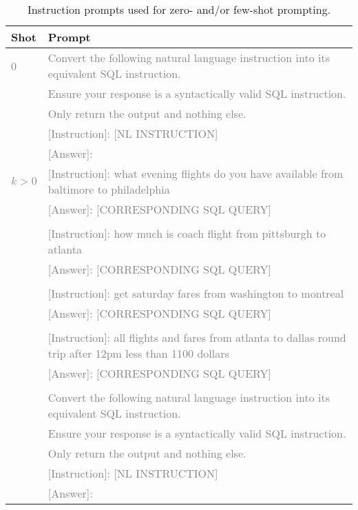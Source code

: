 \documentclass{article}
\begin{document}
\begin{table}[h!]
\centering
\begin{tabular}{p{1cm}p{12cm}}
\toprule
\textbf{Shot} & \textbf{Prompt} \\
\midrule
    \textcolor{gray}{0} & \textcolor{gray}{Convert the following natural language instruction into its equivalent SQL instruction.} \\
    & \textcolor{gray}{Ensure your response is a syntactically valid SQL instruction.} \\
    & \textcolor{gray}{Only return the output and nothing else.} \\
    & \textcolor{gray}{[Instruction]: [NL INSTRUCTION]} \\
    & \textcolor{gray}{[Answer]: } \\
\midrule

\textcolor{gray}{$k > 0$} & \textcolor{gray}{[Instruction]: what evening flights do you have available from baltimore to philadelphia }\\
& \textcolor{gray}{[Answer]: [CORRESPONDING SQL QUERY]} \\
& \\
& \textcolor{gray}{[Instruction]: how much is coach flight from pittsburgh to atlanta} \\
& \textcolor{gray}{[Answer]: [CORRESPONDING SQL QUERY]} \\
& \\
& \textcolor{gray}{[Instruction]: get saturday fares from washington to montreal} \\
& \textcolor{gray}{[Answer]: [CORRESPONDING SQL QUERY]} \\
& \\
& \textcolor{gray}{[Instruction]: all flights and fares from atlanta to dallas round trip after 12pm less than 1100 dollars} \\
& \textcolor{gray}{[Answer]: [CORRESPONDING SQL QUERY]} \\
& \\
& \textcolor{gray}{Convert the following natural language instruction into its equivalent SQL instruction.} \\
& \textcolor{gray}{Ensure your response is a syntactically valid SQL instruction.} \\
& \textcolor{gray}{Only return the output and nothing else.} \\
& \textcolor{gray}{[Instruction]: [NL INSTRUCTION]} \\
& \textcolor{gray}{[Answer]: } \\
\bottomrule
\end{tabular}
\caption{Instruction prompts used for zero- and/or few-shot prompting.}
\label{tab:icl_prompts}
\end{table}
\end{document}
